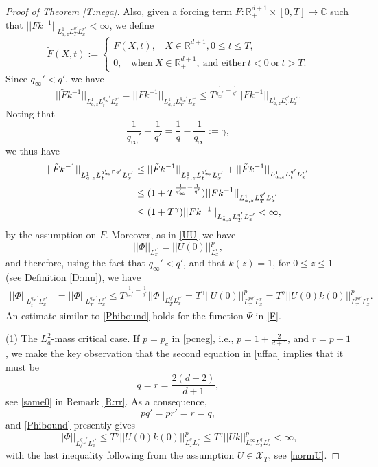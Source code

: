\documentclass[11pt,letter]{amsart}
\def \RN {\mathbb{R}_+^{d+1}}
\numberwithin{equation}{section}
\newcommand{\XT}{\mathcal{X}_T}
\newcommand{\C}{\mathbb{C}}
\numberwithin{equation}{section}
\begin{document}
\begin{proof}[Proof of Theorem \ref{T:nega}]
Also, given a forcing term $F:\RN\times[0,T]\to \C$ such that $||F k^{-1}||_{L^1_{a,z} L^{q'}_T L^{r'}_x}<\infty$, we define
\[
\tilde F(X,t) := \begin{cases}
F(X,t),\ \ \ \  X\in \RN, 0\le t\le T,
\\
0,\ \ \ \ \text{when}\ X\in \RN,\ \text{and either}\ t<0\ \text{or}\ t>T.
\end{cases}
\]
Since $q_\infty'<q'$, we have
\[
||\tilde F k^{-1}||_{L^1_{a,z} L^{q_\infty'}_t L^{r'}_x } = ||F k^{-1}||_{L^1_{a,z} L^{q_\infty'}_T L^{r'}_x }\le T^{\frac{1}{q_\infty'}- \frac{1}{q'}} ||F k^{-1}||_{L^1_{a,z} L^{q'}_T L^{r'}_x }. 
\]
Noting that 
\[
\frac{1}{q_\infty'}- \frac{1}{q'} = \frac 1q - \frac{1}{q_\infty} := \gamma,
\]
we thus have 
\begin{align}\label{tildeF}
||\tilde F k^{-1}||_{L^1_{a,z} L^{q_\infty'\cap q'}_t L^{r'}_x } & \le ||\tilde F k^{-1}||_{L^1_{a,z}L^{q_\infty'}_t L^{r'}_x} + ||\tilde F k^{-1}||_{L^1_{a,z} L^{q'}_t L^{r'}_x}
\\
& \le (1+T^{\frac{1}{q_\infty'}- \frac{1}{q'}}) ||F k^{-1}||_{L^1_{a,z} L^{q'}_T L^{r'}_x }
\notag\\
& \le (1+T^{\gamma}) ||F k^{-1}||_{L^1_{a,z} L^{q'}_T L^{r'}_x } <\infty,
\notag
\end{align} 
by the assumption on $F$.
Moreover, as in \eqref{UU}
we have
\[
||\Phi||_{L^{r'}_x} = ||U(0)||_{L^r_x}^p,
\]
and therefore, using the fact that $q_\infty'<q'$, and that $k(z) = 1$, for $0\le z\le 1$ (see Definition \ref{D:mn}), we have 
\begin{align}\label{Phibound}
||\Phi||_{L^{q_\infty'}_t L_x^{r'}} & = ||\Phi||_{L^{q_\infty'}_T L_x^{r'}}\le T^{\frac{1}{q_\infty'}-\frac{1}{q'}} ||\Phi||_{L^{q'}_T L_x^{r'}} = T^{\gamma}  ||U(0)||_{L^{pq'}_T L^r_x}^p 
= T^{\gamma} ||U(0) k(0)||_{L^{pq'}_T L^r_x}^p.
\end{align}
An estimate similar to \eqref{Phibound} holds for the function $\Psi$ in \eqref{F}. 


\medskip 

\noindent \underline{(1) The $L^2_a$-mass critical case.} If $p = p_c$ in \eqref{pcneg}, i.e., $p = 1 + \frac{2}{d+1}$, and 
$r = p +1$, we make the key observation that the second equation in \eqref{uffaa} implies that it must be
\[
q = r = \frac{2(d+2)}{d+1},
\]
see \eqref{same0} in Remark \ref{R:rr}. As a consequence, 
\[
p q' = p r' = r = q,
\]
and \eqref{Phibound} presently gives
\begin{equation}\label{Phiphi}
||\Phi||_{L^{q_\infty'}_t L_x^{r'}} \le T^{\gamma} ||U(0) k(0)||_{L^{q}_T L^r_x}^p \le  T^{\gamma} ||U k||_{L^\infty_z L^{q}_T L^r_x}^p <\infty,
\end{equation}
with the last inequality following from the assumption $U\in \XT$, see \eqref{normU}.


\end{proof}
\end{document}
